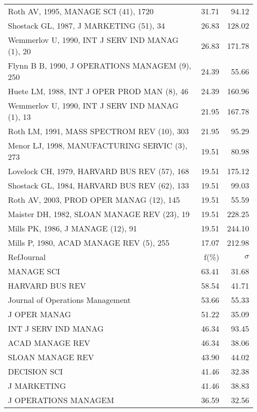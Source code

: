 \documentclass[a4paper,11pt]{report}
\begin{document}
\begin{landscape}
\begin{table}[!ht]
{\begin{tabular}{|l r r|}
Roth AV, 1995, MANAGE SCI (41), 1720 & 31.71 & 94.12\\
Shostack GL, 1987, J MARKETING (51), 34 & 26.83 & 128.02\\
Wemmerlov U, 1990, INT J SERV IND MANAG (1), 20 & 26.83 & 171.78\\
Flynn B B, 1990, J OPERATIONS MANAGEM (9), 250 & 24.39 & 55.66\\
Huete LM, 1988, INT J OPER PROD MAN (8), 46 & 24.39 & 160.96\\
Wemmerlov U, 1990, INT J SERV IND MANAG (1), 13 & 21.95 & 167.78\\
Roth LM, 1991, MASS SPECTROM REV (10), 303 & 21.95 & 95.29\\
Menor LJ, 1998, MANUFACTURING SERVIC (3), 273 & 19.51 & 80.98\\
Lovelock CH, 1979, HARVARD BUS REV (57), 168 & 19.51 & 175.12\\
Shostack GL, 1984, HARVARD BUS REV (62), 133 & 19.51 & 99.03\\
Roth AV, 2003, PROD OPER MANAG (12), 145 & 19.51 & 55.59\\
Maister DH, 1982, SLOAN MANAGE REV (23), 19 & 19.51 & 228.25\\
Mills PK, 1986, J MANAGE (12), 91 & 19.51 & 244.10\\
Mills P, 1980, ACAD MANAGE REV (5), 255 & 17.07 & 212.98\\
\hline
\hline
RefJournal & f(\%) & $\sigma$\\
\hline
MANAGE SCI & 63.41 & 31.68\\
HARVARD BUS REV & 58.54 & 41.71\\
Journal of Operations Management & 53.66 & 55.33\\
J OPER MANAG & 51.22 & 35.09\\
INT J SERV IND MANAG & 46.34 & 93.45\\
ACAD MANAGE REV & 46.34 & 38.06\\
SLOAN MANAGE REV & 43.90 & 44.02\\
DECISION SCI & 41.46 & 32.38\\
J MARKETING & 41.46 & 38.83\\
J OPERATIONS MANAGEM & 36.59 & 32.56\\
\hline
\end{tabular}
}
\end{table}

\clearpage


\end{landscape}
\end{document}
